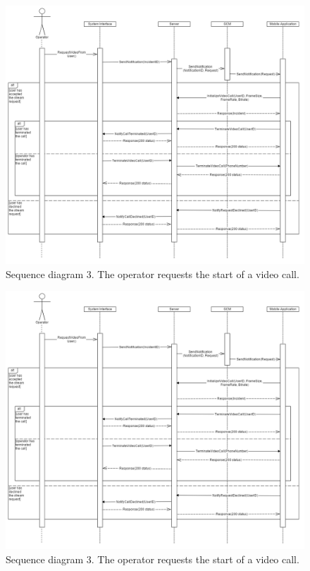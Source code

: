 \documentclass{article}
\begin{document}
	\begin{figure}[H]
		\centering
		\includegraphics[width=1\textwidth]{"EmergencyAppIteration1/sequenceoperatorrequestvideo"}
		Sequence diagram 3. The operator requests the start of a video call.
	\end{figure}
	
	
	\begin{figure}[H]
		\centering
		\includegraphics[width=1\textwidth]{"EmergencyAppIteration1/sequenceoperatorrequestvideo"}
		Sequence diagram 3. The operator requests the start of a video call.
	\end{figure}
\end{document}
